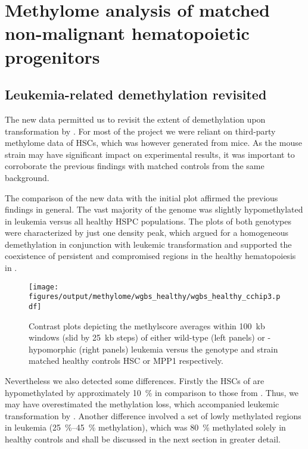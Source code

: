 \chapter{Methylome analysis of matched non-malignant hematopoietic progenitors}
\label{chap:r:wgbs_chip_hsc}

\setcounter{section}{1}
\section{Leukemia-related demethylation revisited}
 \label{chap:r:wgbs_chip_hsc:leukemia}

The new data permitted us to revisit the extent of demethylation upon transformation by \mllafnine. For most of the project we were reliant on third-party methylome data of HSCs, which was however generated from \mmblsix mice\cite{Jeong2014}. As the mouse strain may have significant impact on experimental results, it was important to corroborate the previous findings with matched controls from the same background.

The comparison of the new data with the initial plot affirmed the previous findings in general. The vast majority of the genome was slightly hypomethylated in leukemia versus all healthy HSPC populations. The plots of both genotypes were characterized by just one density peak, which argued for a homogeneous demethylation in conjunction with leukemic transformation and supported the coexistence of persistent and compromised regions in the healthy hematopoiesis in \dnmtchip.

\begin{figure}[!ht] 
	\centering
	\texttt{[image: figures/output/methylome/wgbs\_healthy/wgbs\_healthy\_cchip3.pdf]} 
	\caption{Contrast plots depicting the methylscore averages within \SI{100}{\kilo b} windows (slid by \SI{25}{\kilo b} steps) of either wild-type (left panels) or -hypomorphic (right panels) \mllafnine \kitpos leukemia versus the genotype and strain matched healthy controls HSC or MPP1 respectively.}
	\label{fig:wgbs_healthy_cchip3}
\end{figure}

Nevertheless we also detected some differences. Firstly the HSCs of \dnmtwt \mmsvjae are hypomethylated by approximately \SI{10}{\percent} in comparison to those from \mmblsix. Thus, we may have overestimated the methylation loss, which accompanied leukemic transformation by \mllafnine. Another difference involved a set of lowly methylated regions in leukemia (\SIrange{25}{45}{\percent} methylation), which was \SI{80}{\percent} methylated solely in \dnmtwt healthy controls and shall be discussed in the next section in greater detail. 	

